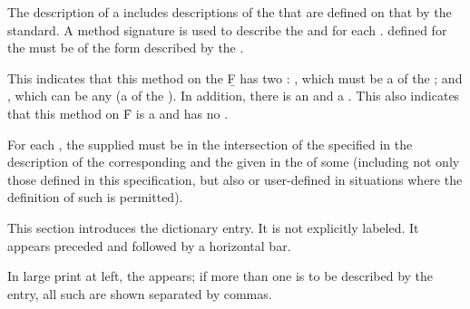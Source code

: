 \endsubsubsection%


The description of a  includes descriptions of the
 that are defined on that  by the standard.  
A method signature is used to describe the  and 
 for each . 
 defined for the  must be of the form described
by the  . 

 {
	      {\opt}  {\key} }

\noindent This  indicates that this method on the 
\b{F} has two :
     , which must be a  of the  ;
 and , which can  be any  
       (\ie a  of the  ).
In addition, there is an   and a
 .  This  also indicates that this
method on \f{F} is a  and has no .

For each , the  supplied must be in the
intersection of the  specified in the description of the
corresponding  and the  given in 
the  of some  (including not only those 
 defined in this specification, but also
 or user-defined  in situations
where the definition of such  is permitted).

\endsubsubsection%


This section introduces the dictionary entry.  It is not explicitly labeled.
It appears preceded and followed by a horizontal bar.

In large print at left, the  appears; if more than one
 is to be described by the entry, all such  
are shown separated by commas.

